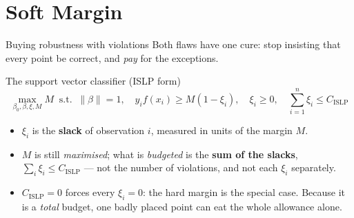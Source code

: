 \documentclass[aspectratio=169,11pt]{beamer}
\begin{document}
\section{Soft Margin}

\begin{frame}{Buying robustness with violations}
  \footnotesize
  Both flaws have one cure: stop insisting that every point be correct, and
  \emph{pay} for the exceptions.
  \begin{block}{The support vector classifier (ISLP form)}
    \[
      \boxed{\;
      \max_{\beta_0,\beta,\xi,M} M
      \ \text{ s.t. }\
      \|\beta\|=1,\quad
      y_i f(x_i)\ge M(1-\xi_i),\quad
      \xi_i\ge0,\quad \sum_{i=1}^n \xi_i \le C_{\text{ISLP}} \;}
    \]
  \end{block}
  \begin{readme}
    \begin{itemize}
      \item $\xi_i$ is the \textbf{slack} of observation $i$, measured in units
            of the margin $M$.
      \item $M$ is still \emph{maximised}; what is \emph{budgeted} is the
            \textbf{sum of the slacks}, $\sum_i\xi_i \le C_{\text{ISLP}}$ ---
            not the number of violations, and not each $\xi_i$ separately.
      \item $C_{\text{ISLP}}=0$ forces every $\xi_i=0$: the hard margin is the
            special case. Because it is a \emph{total} budget, one badly placed
            point can eat the whole allowance alone.
    \end{itemize}
  \end{readme}
\end{frame}
\end{document}
